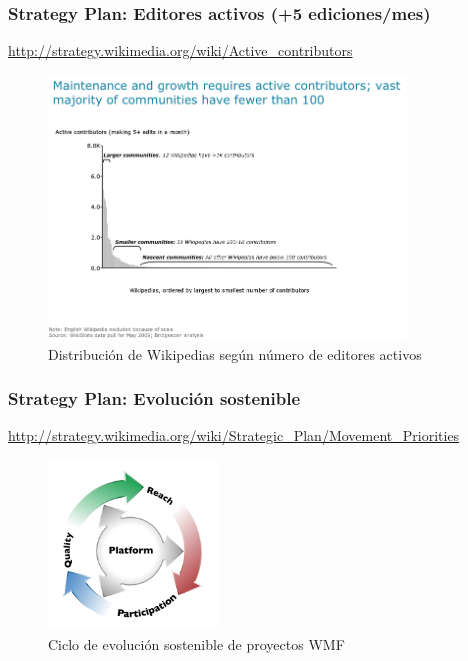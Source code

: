 
\begin{frame}
\frametitle{Strategy Plan: Editores activos (+5 ediciones/mes)}

\url{http://strategy.wikimedia.org/wiki/Active_contributors}

    \begin{figure}[htp]
    \centering
    \includegraphics[width=9.5cm]{figs/Active-contributors-by-wikipedia.png}
    \caption{Distribución de Wikipedias según número de editores activos}
    \end{figure}

\end{frame}


\begin{frame}
\frametitle{Strategy Plan: Evolución sostenible}

\url{http://strategy.wikimedia.org/wiki/Strategic_Plan/Movement_Priorities}

    \begin{figure}[htp]
    \centering
    \includegraphics[width=4.5cm]{figs/Virtuous-Circle.jpg}
    \caption{Ciclo de evolución sostenible de proyectos WMF}
    \end{figure}

\end{frame}


